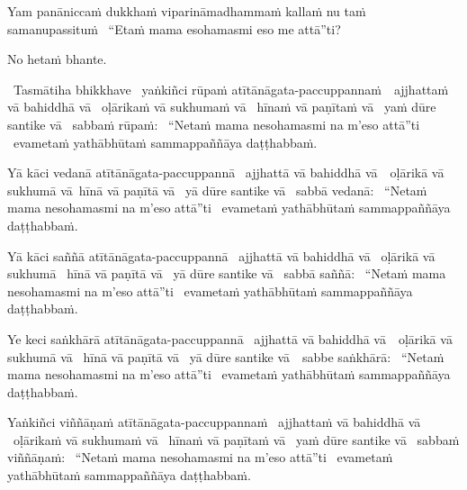\begin{pali-hangtogether}
  Yam panāniccaṁ dukkhaṁ viparināmadhammaṁ kallaṁ nu taṁ samanupassituṁ \breathmark\ ``Etaṁ mama esohamasmi eso me attā''ti?
\end{pali-hangtogether}

\begin{pali-hangtogether}
  No hetaṁ bhante.
\end{pali-hangtogether}

\begin{pali-hang}
  \anglebracketleft\ \hspace{-0.5mm}Tasmātiha bhikkhave \hspace{-0.5mm}\anglebracketright\ yaṅkiñci rūpaṁ atītānāgata-\mbox{paccuppannaṁ}~\breathmark\ ajjhattaṁ vā bahiddhā vā \breathmark\ oḷārikaṁ vā sukhumaṁ vā \breathmark\ hīnaṁ vā paṇītaṁ vā \breathmark\ yaṁ dūre santike vā \breathmark\ sabbaṁ rūpaṁ: \breathmark\ ``Netaṁ mama nesohamasmi na m'eso attā''ti \breathmark\ evametaṁ yathābhūtaṁ sammappaññāya daṭṭhabbaṁ.
\end{pali-hang}

\begin{pali-hang}
  Yā kāci vedanā atītānāgata-paccuppannā \breathmark\ ajjhattā vā bahiddhā \mbox{vā}~\breathmark\ oḷārikā vā sukhumā vā\breathmark\ hīnā vā paṇītā vā \breathmark\ yā dūre santike vā \breathmark\ sabbā vedanā: \breathmark\ ``Netaṁ mama nesohamasmi na m'eso attā''ti \breathmark\ evametaṁ yathābhūtaṁ sammappaññāya daṭṭhabbaṁ.
\end{pali-hang}

\begin{pali-hang}
  Yā kāci saññā atītānāgata-paccuppannā \breathmark\ ajjhattā vā bahiddhā vā \breathmark\ oḷārikā vā sukhumā \breathmark\ hīnā vā paṇītā vā \breathmark\ yā dūre santike vā \breathmark\ sabbā saññā: \breathmark\ ``Netaṁ mama nesohamasmi na m'eso attā''ti \breathmark\ evametaṁ yathābhūtaṁ sammappaññāya daṭṭhabbaṁ.
\end{pali-hang}

\begin{pali-hang}
  Ye keci saṅkhārā atītānāgata-paccuppannā \breathmark\ ajjhattā vā bahiddhā \mbox{vā}~\breathmark\ oḷārikā vā sukhumā vā \breathmark\ hīnā vā paṇītā vā \breathmark\ yā dūre santike \mbox{vā}~\breathmark\ sabbe saṅkhārā: \breathmark\ ``Netaṁ mama nesohamasmi na m'eso attā''ti \breathmark\ evametaṁ yathābhūtaṁ sammappaññāya daṭṭhabbaṁ.
\end{pali-hang}

\begin{pali-hang}
  Yaṅkiñci viññāṇaṁ atītānāgata-paccuppannaṁ \breathmark\ ajjhattaṁ vā bahiddhā vā \breathmark\ oḷārikaṁ vā sukhumaṁ vā \breathmark\ hīnaṁ vā paṇītaṁ vā \breathmark\ yaṁ dūre santike vā \breathmark\ sabbaṁ viññāṇaṁ: \breathmark\ ``Netaṁ mama nesohamasmi na m'eso attā''ti \breathmark\ evametaṁ yathābhūtaṁ sammappaññāya daṭṭhabbaṁ.
\end{pali-hang}

